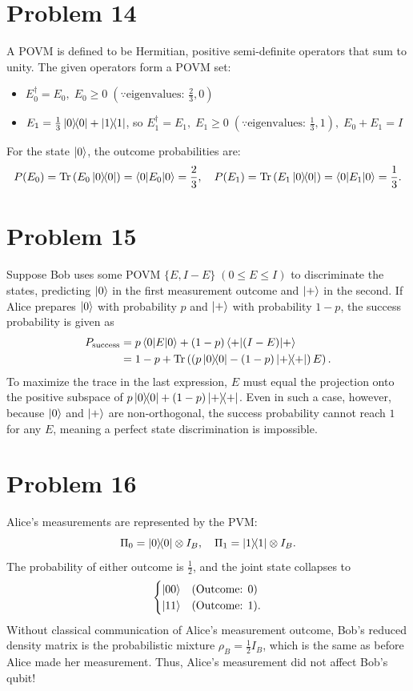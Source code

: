 \documentclass[11pt]{article}
\begin{document}
\section*{Problem 14}
A POVM is defined to be Hermitian, positive semi-definite operators that sum to unity.
The given operators form a POVM set:
\begin{itemize}
    \item $E_0^\dagger = E_0,\;
        E_0 \geq 0\; (\because \text{eigenvalues: } \frac{2}{3}, 0)$

    \item $E_1 = \frac{1}{3}\ketbra{0}{0} + \ketbra{1}{1}$, so
        $E_1^\dagger = E_1,\;
        E_1 \geq 0\; (\because \text{eigenvalues: } \frac{1}{3}, 1),\;
        E_0 + E_1 = I$
\end{itemize}
For the state $\ket{0}$, the outcome probabilities are:
\[
    P(E_0) = \operatorname{Tr}\left(E_0\ketbra{0}{0}\right) = \braket{0 | E_0 | 0} = \frac{2}{3},\quad
    P(E_1) = \operatorname{Tr}\left(E_1\ketbra{0}{0}\right) = \braket{0 | E_1 | 0} = \frac{1}{3}.
\]

\section*{Problem 15}
Suppose Bob uses some POVM $\{E, I - E\}\; (0 \leq E \leq I)$ to discriminate the states,
predicting $\ket{0}$ in the first measurement outcome and $\ket{+}$ in the second.
If Alice prepares $\ket{0}$ with probability $p$ and $\ket{+}$ with probability $1 - p$,
the success probability is given as
\begin{align*}
    P_{\text{success}}
    &= p \braket{0 | E | 0} + (1 - p) \braket{+ | (I - E) | +} \\
    &= 1 - p + \operatorname{Tr}\left(\left(p\ketbra{0}{0} - (1-p) \ketbra{+}{+}\right) E\right).
\end{align*}
To maximize the trace in the last expression, $E$ must equal the projection
onto the positive subspace of $p\ketbra{0}{0} + (1-p)\ketbra{+}{+}$.
Even in such a case, however, because $\ket{0}$ and $\ket{+}$ are non-orthogonal,
the success probability cannot reach $1$ for any $E$,
meaning a perfect state discrimination is impossible.

\section*{Problem 16}
Alice's measurements are represented by the PVM:
\[
    \Pi_0 = \ketbra{0}{0} \otimes I_B,\quad
    \Pi_1 = \ketbra{1}{1} \otimes I_B.
\]
The probability of either outcome is $\frac{1}{2}$,
and the joint state collapses to
\[
    \begin{cases}
        \ket{00} & (\text{Outcome: } 0) \\ \ket{11} & (\text{Outcome: } 1).
    \end{cases}
\]
Without classical communication of Alice's measurement outcome,
Bob's reduced density matrix is the probabilistic mixture $\rho_B = \frac{1}{2} I_B$,
which is the same as before Alice made her measurement.
Thus, Alice's measurement did not affect Bob's qubit!
\end{document}

